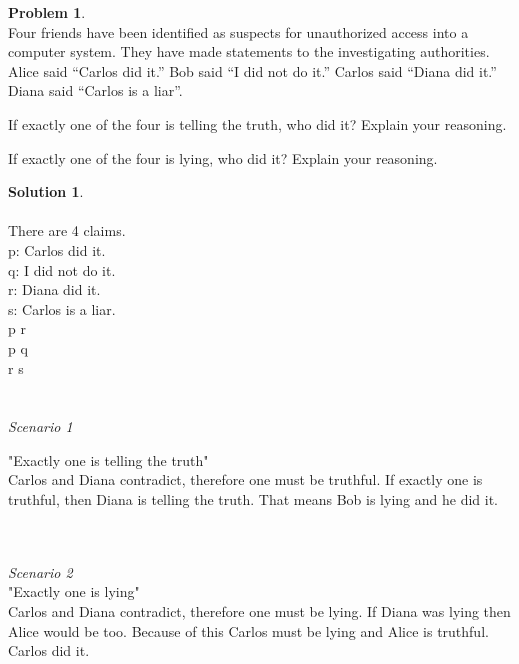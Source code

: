 \documentclass{article}
\theoremstyle{definition}
\newtheorem{problem}{Problem}
\newtheorem*{solution}{Solution}
\begin{document}
\newpage

\begin{problem}\ \\
Four friends have been identified as suspects for unauthorized access into a computer system.  They have made statements to the investigating authorities.  Alice said ``Carlos did it.''  Bob said ``I did not do it.''  Carlos said ``Diana did it.''  Diana said ``Carlos is a liar''.
\begin{compactenum}
\item If exactly one of the four is telling the truth, who did it?  Explain your reasoning.
\item If exactly one of the four is lying, who did it?  Explain your reasoning.
\end{compactenum}
\end{problem}

\begin{solution}\ \\
\\
\noindent There are 4 claims.\\
 p: Carlos did it.\\
 q: I did not do it.\\
 r: Diana did it.\\
 s: Carlos is a liar.\\
 p \to \neg r \\ 
 p \to q \\
 r \oplus s \\
\\
\\
\textit{Scenario 1}\
\begin{compactenum}
"Exactly one is telling the truth"
\\
Carlos and Diana contradict, therefore one must be truthful. If exactly one is truthful, then Diana is telling the truth. That means Bob is lying and he did it.

\\
\\
\textit{Scenario 2}\\

"Exactly one is lying"
\\
Carlos and Diana contradict, therefore one must be lying. If Diana was lying then Alice would be too. Because of this Carlos must be lying and Alice is truthful. Carlos did it. 
\\
\end{compactenum}
\end{solution}
\end{document}

